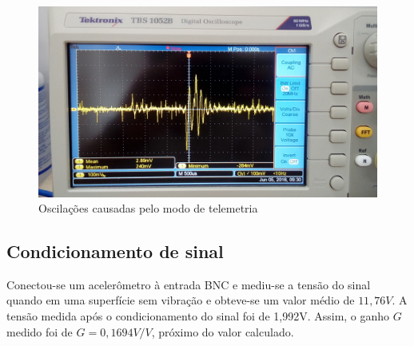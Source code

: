 \documentclass[
	12pt,				%
	openright,			%
	twoside,			%
	a4paper,			%
	english,			%
	french,				%
	spanish,			%
	brazil,				%
	]{abntex2}
\begin{document}
			\begin{figure}[!ht]
				\centering
				\includegraphics[width = \linewidth]{../Fotos/osc33.jpg}
				\caption{Oscilações causadas pelo modo de telemetria}
				\label{fig:oscNrf}
			\end{figure}

		\subsection{Condicionamento de sinal}
			Conectou-se um acelerômetro à entrada BNC e mediu-se a
			tensão do sinal quando em uma superfície sem vibração e
			obteve-se um valor médio de $11,76V$. A tensão medida após o
			condicionamento do sinal foi de 1,992V. Assim, o ganho $G$
			medido foi de $G = 0,1694V/V$, próximo do valor calculado.
\end{document}
